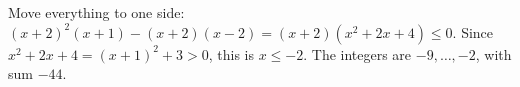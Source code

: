 Move everything to one side: $(x+2)^2(x+1)-(x+2)(x-2)=(x+2)\left(x^2+2x+4\right)\le0$. Since $x^2+2x+4=(x+1)^2+3>0$, this is $x\le-2$. The integers are $-9,\dots,-2$, with sum $\boxed{-44}$.
